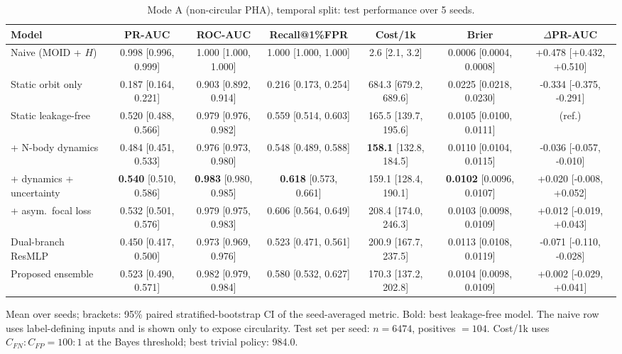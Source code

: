 \begin{table}[t]
\centering
\small
\caption{Mode A (non-circular PHA), temporal split: test performance over 5 seeds.}
\label{tab:pha_temporal_all}
\begin{tabular}{lcccccc}
\toprule
Model & PR-AUC & ROC-AUC & Recall@1\%FPR & Cost/1k & Brier & $\Delta$PR-AUC \\
\midrule
Naive (MOID + $H$) & 0.998 \scriptsize{[0.996, 0.999]} & 1.000 \scriptsize{[1.000, 1.000]} & 1.000 \scriptsize{[1.000, 1.000]} & 2.6 \scriptsize{[2.1, 3.2]} & 0.0006 \scriptsize{[0.0004, 0.0008]} & +0.478 \scriptsize{[+0.432, +0.510]} \\
\midrule
Static orbit only & 0.187 \scriptsize{[0.164, 0.221]} & 0.903 \scriptsize{[0.892, 0.914]} & 0.216 \scriptsize{[0.173, 0.254]} & 684.3 \scriptsize{[679.2, 689.6]} & 0.0225 \scriptsize{[0.0218, 0.0230]} & -0.334 \scriptsize{[-0.375, -0.291]} \\
Static leakage-free & 0.520 \scriptsize{[0.488, 0.566]} & 0.979 \scriptsize{[0.976, 0.982]} & 0.559 \scriptsize{[0.514, 0.603]} & 165.5 \scriptsize{[139.7, 195.6]} & 0.0105 \scriptsize{[0.0100, 0.0111]} & (ref.) \\
+ N-body dynamics & 0.484 \scriptsize{[0.451, 0.533]} & 0.976 \scriptsize{[0.973, 0.980]} & 0.548 \scriptsize{[0.489, 0.588]} & \textbf{158.1} \scriptsize{[132.8, 184.5]} & 0.0110 \scriptsize{[0.0104, 0.0115]} & -0.036 \scriptsize{[-0.057, -0.010]} \\
+ dynamics + uncertainty & \textbf{0.540} \scriptsize{[0.510, 0.586]} & \textbf{0.983} \scriptsize{[0.980, 0.985]} & \textbf{0.618} \scriptsize{[0.573, 0.661]} & 159.1 \scriptsize{[128.4, 190.1]} & \textbf{0.0102} \scriptsize{[0.0096, 0.0107]} & +0.020 \scriptsize{[-0.008, +0.052]} \\
+ asym.\ focal loss & 0.532 \scriptsize{[0.501, 0.576]} & 0.979 \scriptsize{[0.975, 0.983]} & 0.606 \scriptsize{[0.564, 0.649]} & 208.4 \scriptsize{[174.0, 246.3]} & 0.0103 \scriptsize{[0.0098, 0.0109]} & +0.012 \scriptsize{[-0.019, +0.043]} \\
Dual-branch ResMLP & 0.450 \scriptsize{[0.417, 0.500]} & 0.973 \scriptsize{[0.969, 0.976]} & 0.523 \scriptsize{[0.471, 0.561]} & 200.9 \scriptsize{[167.7, 237.5]} & 0.0113 \scriptsize{[0.0108, 0.0119]} & -0.071 \scriptsize{[-0.110, -0.028]} \\
Proposed ensemble & 0.523 \scriptsize{[0.490, 0.571]} & 0.982 \scriptsize{[0.979, 0.984]} & 0.580 \scriptsize{[0.532, 0.627]} & 170.3 \scriptsize{[137.2, 202.8]} & 0.0104 \scriptsize{[0.0098, 0.0109]} & +0.002 \scriptsize{[-0.029, +0.041]} \\
\bottomrule
\end{tabular}
\par\vspace{2pt}\footnotesize Mean over seeds; brackets: 95\% paired stratified-bootstrap CI of the seed-averaged metric. Bold: best leakage-free model. The naive row uses label-defining inputs and is shown only to expose circularity. Test set per seed: $n=6474$, positives $=104$. Cost/1k uses $C_{FN}{:}C_{FP}=100{:}1$ at the Bayes threshold; best trivial policy: 984.0.
\end{table}

